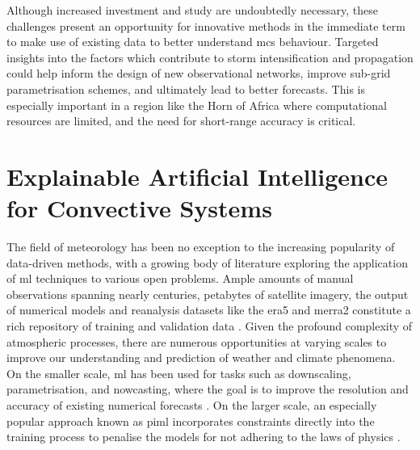 Although increased investment and study are undoubtedly necessary, these challenges present an opportunity for innovative methods in the immediate term to make use of existing data to better understand \acrshort{mcs} behaviour. Targeted insights into the factors which contribute to storm intensification and propagation could help inform the design of new observational networks, improve sub-grid parametrisation schemes, and ultimately lead to better forecasts. This is especially important in a region like the Horn of Africa where computational resources are limited, and the need for short-range accuracy is critical.

\section{Explainable Artificial Intelligence for Convective Systems}

The field of meteorology has been no exception to the increasing popularity of data-driven methods, with a growing body of literature exploring the application of \acrshort{ml} techniques to various open problems. Ample amounts of manual observations spanning nearly centuries, petabytes of satellite imagery, the output of numerical models and reanalysis datasets like the \acrfull{era5} and \acrfull{merra2} constitute a rich repository of training and validation data \citep{Bracco2024,Waqas2024,Zhang2025}. Given the profound complexity of atmospheric processes, there are numerous opportunities at varying scales to improve our understanding and prediction of weather and climate phenomena. On the smaller scale, \acrshort{ml} has been used for tasks such as downscaling, parametrisation, and nowcasting, where the goal is to improve the resolution and accuracy of existing numerical forecasts \citep{Blunn2024,Zhang2023}. On the larger scale, an especially popular approach known as \acrfull{piml} incorporates constraints directly into the training process to penalise the models for not adhering to the laws of physics \citep{Dabrowski2020,Luo2025,Zhang2023}.

